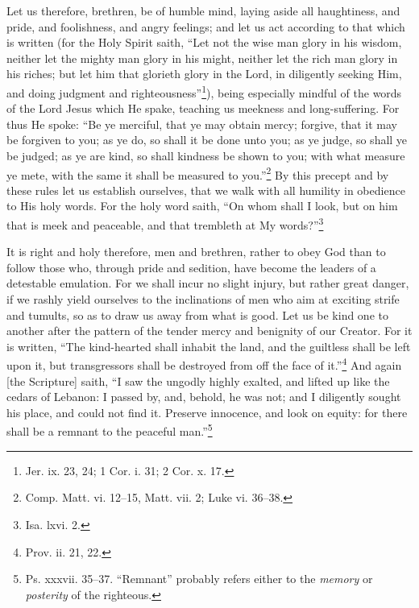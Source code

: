
Let us therefore, brethren, be of humble mind, laying aside all haughtiness, and pride, and foolishness, and angry feelings; and let us act according to that which is written (for the Holy Spirit saith, “Let not the wise man glory in his wisdom, neither let the mighty man glory in his might, neither let the rich man glory in his riches; but let him that glorieth glory in the Lord, in diligently seeking Him, and doing judgment and righteousness”\footnote{Jer. ix. 23, 24; 1 Cor. i. 31; 2 Cor. x. 17.}), being especially mindful of the words of the Lord Jesus which He spake, teaching us meekness and long-suffering. For thus He spoke: “Be ye merciful, that ye may obtain mercy; forgive, that it may be forgiven to you; as ye do, so shall it be done unto you; as ye judge, so shall ye be judged; as ye are kind, so shall kindness be shown to you; with what measure ye mete, with the same it shall be measured to you.”\footnote{Comp. Matt. vi. 12–15, Matt. vii. 2; Luke vi. 36–38.} By this precept and by these rules let us establish ourselves, that we walk with all humility in obedience to His holy words. For the holy word saith, “On whom shall I look, but on him that is meek and peaceable, and that trembleth at My words?”\footnote{Isa. lxvi. 2.}


It is right and holy therefore, men and brethren, rather to obey God than to follow those who, through pride and sedition, have become the leaders of a detestable emulation. For we shall incur no slight injury, but rather great danger, if we rashly yield ourselves to the inclinations of men who aim at exciting strife and tumults, so as to draw us away from what is good. Let us be kind one to another after the pattern of the tender mercy and benignity of our Creator. For it is written, “The kind-hearted shall inhabit the land, and the guiltless shall be left upon it, but transgressors shall be destroyed from off the face of it.”\footnote{Prov. ii. 21, 22.} And again [the Scripture] saith, “I saw the ungodly highly exalted, and lifted up like the cedars of Lebanon: I passed by, and, behold, he was not; and I diligently sought his place, and could not find it. Preserve innocence, and look on equity: for there shall be a remnant to the peaceful man.”\footnote{Ps. xxxvii. 35–37. “Remnant” probably refers either to the \emph{memory} or \emph{posterity} of the righteous.}

